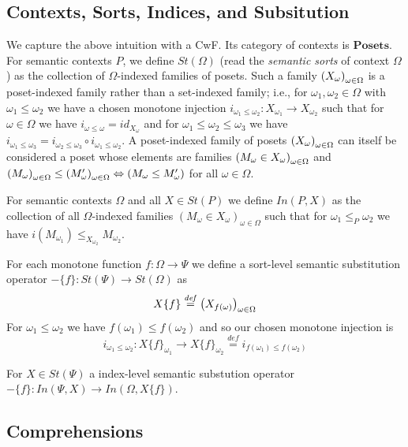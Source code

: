 \documentclass[sigplan,10pt,review,anonymous]{acmart}
\newcommand{\defeq}{\overset{\mathit{def}}{=}}
\newcommand{\mbf}[1]{\mathbf{#1}}
\newcommand{\fm}[2]{
\left(
\tiny
#1
\normalsize
\right)_{#2}
}
\begin{document}
\subsection{Contexts, Sorts, Indices, and Subsitution}

We capture the above intuition with a CwF. Its category of contexts is $\mbf{Posets}$. For semantic contexts $P$, we define $\mathit{St}(\Omega)$ (read the \emph{semantic sorts} of context $\Omega$) as the collection of $\Omega$-indexed families of posets. Such a family $\fm{X_\omega}{\omega \in \Omega}$ is a poset-indexed family rather than a set-indexed family; i.e., for $\omega_1,\omega_2 \in \Omega$ with $\omega_1 \leq \omega_2$ we have a chosen monotone injection $i_{\omega_1 \leq \omega_2} : X_{\omega_1} \to X_{\omega_2}$ such that for $\omega \in \Omega$ we have $i_{\omega \leq \omega} = \mathit{id}_{X_\omega}$ and for $\omega_1 \leq \omega_2 \leq \omega_3$ we have $i_{\omega_1 \leq \omega_3} = i_{\omega_2 \leq \omega_3} \circ i_{\omega_1 \leq \omega_2}$.
A poset-indexed family of posets $\fm{X_\omega}{\omega \in \Omega}$ can itself be considered a poset whose elements are families $\fm{M_\omega \in X_\omega}{\omega \in \Omega}$ and $\fm{M_\omega}{\omega \in \Omega} \leq \fm{M_\omega'}{\omega \in \Omega} \Leftrightarrow (M_\omega \leq M_\omega')$ for all $\omega \in \Omega$.

For semantic contexts $\Omega$ and all $X \in \mathit{St}(P)$ we define $\mathit{In}(P, X)$ as the collection of all $\Omega$-indexed families $(M_\omega \in X_\omega)_{\omega \in \Omega}$ such that for $\omega_1 \leq_P \omega_2$ we have $i(M_{\omega_1}) \leq_{X_{\omega_2}} M_{\omega_2}$.

For each monotone function $f : \Omega \to \Psi$ we define a sort-level semantic substitution operator $- \{ f \} : \mathit{St}(\Psi) \to \mathit{St}(\Omega)$ as 
$$X \{ f \} \defeq \fm{X_{f(\omega)}}{\omega \in \Omega}$$
For $\omega_1 \leq \omega_2$ we have $f(\omega_1) \leq f(\omega_2)$ and so our chosen monotone injection is 
$$i_{\omega_1 \leq \omega_2} : X\{ f \}_{\omega_1} \to X \{ f \}_{\omega_2} \defeq i_{f(\omega_1) \leq f(\omega_2)}$$

For $X \in \mathit{St}(\Psi)$ a index-level semantic substution operator $- \{ f \} : \mathit{In}(\Psi,X) \to \mathit{In}(\Omega, X \{ f \})$.

\subsection{Comprehensions}
\end{document}
